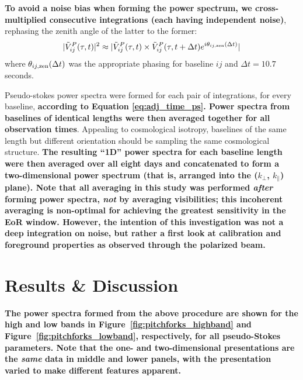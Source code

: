 \documentclass[twocolumn, trackchanges]{aastex61}
\newcommand{\edited}[1]{{\bf \color{red} #1}}
\begin{document}
\edited{To avoid a noise bias when forming the power spectrum, 
we cross-multiplied consecutive integrations (each having independent noise)}, 
rephasing the zenith angle of the latter to the former:
\begin{equation}
\label{eq:adj_time_ps}
 | \tilde{V}_{ij}^{P}(\tau, t) |^2 \approx | \tilde{V}_{ij}^{P}(\tau, t) \times \tilde{V}_{ij}^{P}(\tau, t+\Delta t)e^{i\theta_{ij,\rm zen}(\Delta t)}|
\end{equation}
where $\theta_{ij,\rm zen}(\Delta t)$ was the appropriate phasing for baseline $ij$ and $\Delta t = 10.7$ seconds.

Pseudo-stokes power spectra were formed for each pair of integrations, for every baseline, \edited{according to Equation \ref{eq:adj_time_ps}.  Power spectra from baselines of identical lengths were then averaged together for all observation times}.  Appealing to cosmological isotropy, baselines of the same length but different orientation should be sampling the same cosmological structure.  
\edited{The resulting ``1D'' power spectra for each baseline length were then averaged over all eight days and concatenated to form a  two-dimensional power spectrum (that is, arranged into the ($k_{\perp}$, $k_{\parallel}$) plane).  Note that all averaging in this study was performed {\it after} forming power spectra, {\it not} by averaging visibilities; this incoherent averaging is non-optimal for achieving the greatest sensitivity in the EoR window.  However, the intention of this investigation was not a deep integration on noise, but rather a first look at calibration and foreground properties as observed through the polarized beam.}

\section{Results \& Discussion}
\label{sec:results}

\edited{The power spectra formed from the above procedure are shown for the high and low bands in Figure~\ref{fig:pitchforks_highband} and Figure~\ref{fig:pitchforks_lowband}, respectively, for all pseudo-Stokes parameters.  Note that the one- and two-dimensional presentations are the {\it same} data in middle and lower panels, with the presentation varied to make different features apparent.} 
\end{document}
